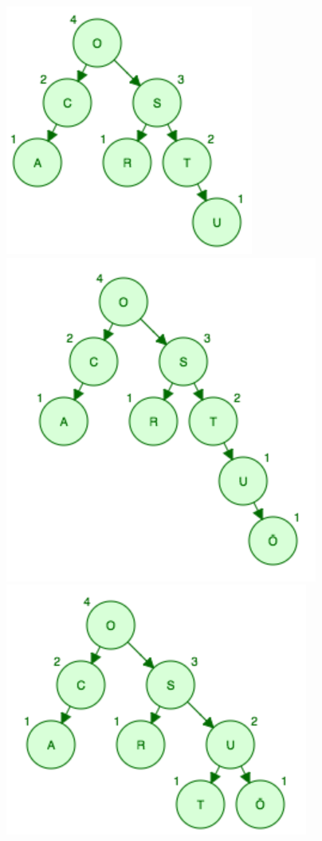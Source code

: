 \documentclass[a5paper,10pt,oneside]{article}
\begin{document}
\includegraphics[scale=0.3]{advEnk}
\includegraphics[scale=0.3]{advEnkB}
\includegraphics[scale=0.3]{advEnkA}
\end{document}

